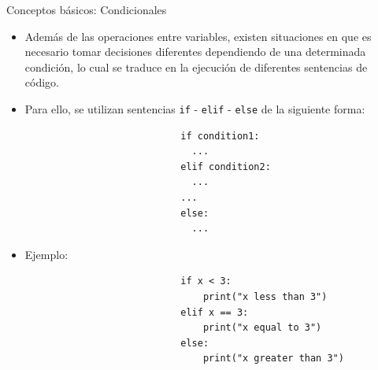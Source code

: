 \documentclass{beamer}
\begin{document}
    \begin{frame}[fragile]{Conceptos básicos: Condicionales}
        \begin{itemize}
          \item Además de las operaciones entre variables, existen situaciones en que es necesario tomar decisiones diferentes dependiendo de una determinada condición, lo cual se traduce en la ejecución de diferentes sentencias de código.
          \item Para ello, se utilizan sentencias \texttt{if} - \texttt{elif} - \texttt{else} de la siguiente forma:

          \begin{figure}
              \begin{minipage}[c]{0.5\textwidth}
                  \begin{verbatim}
                      if condition1:
                        ...
                      elif condition2:
                        ...
                      ...
                      else:
                        ...
                  \end{verbatim}
              \end{minipage}
          \end{figure}
          \item Ejemplo:
          \begin{figure}
              \begin{minipage}[c]{0.5\textwidth}
                  \begin{verbatim}
                      if x < 3:
                          print("x less than 3")
                      elif x == 3:
                          print("x equal to 3")
                      else:
                          print("x greater than 3")
                  \end{verbatim}
              \end{minipage}
          \end{figure}
        \end{itemize}
    \end{frame}
\end{document}
